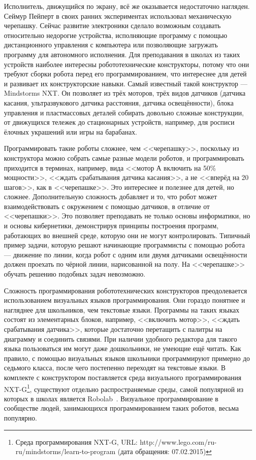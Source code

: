 Исполнитель, движущийся по экрану, всё же оказывается недостаточно нагляден. Сеймур Пейперт 
в своих ранних экспериментах использовал механическую черепашку. Сейчас развитие электроники 
сделало возможным создавать относительно недорогие устройства, исполняющие программу 
с помощью дистанционного управления с компьютера или позволяющие загружать программу 
для автономного исполнения. Для преподавания в школах из таких устройств наиболее 
интересны робототехнические конструкторы, потому что они требуют сборки робота перед 
его программированием, что интереснее для детей и развивает их конструкторские навыки. 
Самый известный такой конструктор --- Mindstorms NXT. Он позволяет из трёх моторов, 
трёх видов датчиков (датчика касания, ультразвукового датчика расстояния, датчика 
освещённости), блока управления и пластмассовых деталей собирать довольно сложные 
конструкции, от движущихся тележек до стационарных устройств, например, для росписи 
ёлочных украшений или игры на барабанах. 

Программировать такие роботы сложнее, чем <<черепашку>>, поскольку из конструктора 
можно собрать самые разные модели роботов, и программировать приходится в терминах, 
например, вида <<мотор А включить на 50\% мощности>>, <<ждать срабатывания датчика касания>>, 
а не <<вперёд на 20 шагов>>, как в <<черепашке>>. Это интереснее и полезнее для детей, 
но сложнее. Дополнительную сложность добавляет и то, что робот может взаимодействовать 
с окружением с помощью датчиков, в отличие от <<черепашки>>. Это позволяет преподавать 
не только основы информатики, но и основы кибернетики, демонстрируя принципы построения 
программ, работающих во внешней среде, которую они не могут контролировать. Типичный 
пример задачи, которую решают начинающие программисты с помощью робота --- движение по линии, 
когда робот с одним или двумя датчиками освещённости должен проехать по чёрной линии, 
нарисованной на полу. На <<черепашке>> обучать решению подобных задач невозможно.

Сложность программирования робототехнических конструкторов преодолевается использованием 
визуальных языков программирования. Они гораздо понятнее и нагляднее для школьников, 
чем текстовые языки. Программы на таких языках состоят из элементарных блоков, например, 
<<включить мотор>>, <<ждать срабатывания датчика>>, которые достаточно перетащить с 
палитры на диаграмму и соединить связями. При наличии удобного редактора для такого 
языка пользоваться им могут даже дошкольники, не умеющие ещё читать. Как правило, с 
помощью визуальных языков школьники программируют примерно до седьмого класса, после 
чего постепенно переходят на текстовые языки. В комплекте с конструктором поставляется среда визуального программирования 
NXT-G\footnote{Среда программирования NXT-G, URL: http://www.lego.com/ru-ru/mindstorms/learn-to-program (дата обращения: 07.02.2015)}, 
существуют отдельно распространяемые среды, самой популярной из которых в школах является Robolab~\cite{portsmore1999robolab}. 
Визуальное программирование в сообществе людей, занимающихся программированием таких роботов, весьма популярно.

